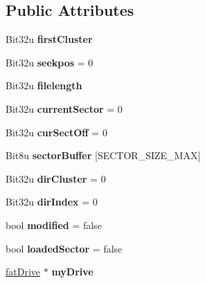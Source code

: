 \subsection*{Public Attributes}
\begin{DoxyCompactItemize}
\item 
\hypertarget{classfatFile_a0ab23d013d75299668159f7b5acfc20f}{Bit32u {\bfseries first\-Cluster}}\label{classfatFile_a0ab23d013d75299668159f7b5acfc20f}

\item 
\hypertarget{classfatFile_a5dfa3257680a81dc52f63616739d3b7b}{Bit32u {\bfseries seekpos} = 0}\label{classfatFile_a5dfa3257680a81dc52f63616739d3b7b}

\item 
\hypertarget{classfatFile_ae14c4b0d1d3ba4940fd097128b8c9717}{Bit32u {\bfseries filelength}}\label{classfatFile_ae14c4b0d1d3ba4940fd097128b8c9717}

\item 
\hypertarget{classfatFile_a10d126dd6ea8e86ba96691e70f4d3795}{Bit32u {\bfseries current\-Sector} = 0}\label{classfatFile_a10d126dd6ea8e86ba96691e70f4d3795}

\item 
\hypertarget{classfatFile_a310779605ffff594badf8dfb72738d36}{Bit32u {\bfseries cur\-Sect\-Off} = 0}\label{classfatFile_a310779605ffff594badf8dfb72738d36}

\item 
\hypertarget{classfatFile_abdc7747a29ed56ef531c69e9a11ab6b1}{Bit8u {\bfseries sector\-Buffer} \mbox{[}S\-E\-C\-T\-O\-R\-\_\-\-S\-I\-Z\-E\-\_\-\-M\-A\-X\mbox{]}}\label{classfatFile_abdc7747a29ed56ef531c69e9a11ab6b1}

\item 
\hypertarget{classfatFile_a1496430cf7bc1f1d681fd66d08e12b5e}{Bit32u {\bfseries dir\-Cluster} = 0}\label{classfatFile_a1496430cf7bc1f1d681fd66d08e12b5e}

\item 
\hypertarget{classfatFile_a0747fdfbf56e3cf6e6b91e9bb1b8a866}{Bit32u {\bfseries dir\-Index} = 0}\label{classfatFile_a0747fdfbf56e3cf6e6b91e9bb1b8a866}

\item 
\hypertarget{classfatFile_a9108545ee15a1eb3c63ffac2d1a6d37e}{bool {\bfseries modified} = false}\label{classfatFile_a9108545ee15a1eb3c63ffac2d1a6d37e}

\item 
\hypertarget{classfatFile_ab7a7ff61e54c4ffa6c303924cd685c29}{bool {\bfseries loaded\-Sector} = false}\label{classfatFile_ab7a7ff61e54c4ffa6c303924cd685c29}

\item 
\hypertarget{classfatFile_ac3d9bcecc8822018478fa69b54e0367f}{\hyperlink{classfatDrive}{fat\-Drive} $\ast$ {\bfseries my\-Drive}}\label{classfatFile_ac3d9bcecc8822018478fa69b54e0367f}

\end{DoxyCompactItemize}


